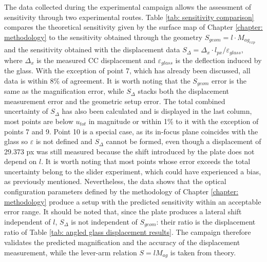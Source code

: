 The data collected during the experimental campaign allows the assessment of sensitivity through two experimental routes. Table \ref{tab: sensitivity comparison} compares the theoretical sensitivity given by the surface map of Chapter \ref{chapter: methodology} to the sensitivity obtained through the geometry $S_{geom} = l \cdot M_{ag_{exp}}$ and the sensitivity obtained with the displacement data $S_\Delta = \Delta_x \cdot l_{px}/\varepsilon_{glass}$, where $\Delta_x$ is the measured CC displacement and $\varepsilon_{glass}$ is the deflection induced by the glass. With the exception of point 7, which has already been discussed, all data is within 8\% of agreement. It is worth noting that the $S_{geom}$ error is the same as the magnification error, while $S_\Delta$ stacks both the displacement measurement error and the geometric setup error. The total combined uncertainty of $S_\Delta$ has also been calculated and is displayed in the last column, most points are below $u_{tot}$ in magnitude or within 1\% to it with the exception of points 7 and 9. Point 10 is a special case, as its in-focus plane coincides with the glass so $\varepsilon$ is not defined and $S_\Delta$ cannot be formed, even though a displacement of 29.373 px was still measured because the shift introduced by the plate does not depend on $l$. It is worth noting that most points whose error exceeds the total uncertainty belong to the slider experiment, which could have experienced a bias, as previously mentioned. Nevertheless, the data shows that the optical configuration parameters defined by the methodology of Chapter \ref{chapter: methodology} produce a setup with the predicted sensitivity within an acceptable error range. It should be noted that, since the plate produces a lateral shift independent of $l$, $S_\Delta$ is not independent of $S_{geom}$: their ratio is the displacement ratio of Table \ref{tab: angled glass displacement results}. The campaign therefore validates the predicted magnification and the accuracy of the displacement measurement, while the lever-arm relation $S = l M_{ag}$ is taken from theory.

